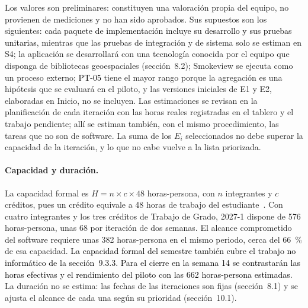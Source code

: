 Los valores son preliminares: constituyen una valoración propia del equipo, no provienen de mediciones y no han sido aprobados. Sus supuestos son los siguientes: \textcolor{black}{cada paquete de implementación incluye su desarrollo y sus pruebas unitarias}, mientras que las pruebas de integración y de sistema solo se estiman en S4; la aplicación se desarrollará con una tecnología conocida por el equipo que disponga de bibliotecas geoespaciales (sección~8.2); Smokeview se ejecuta como un proceso externo; \textcolor{black}{PT-05} tiene el mayor rango porque la agregación es una hipótesis que se evaluará en el piloto, y las versiones iniciales de E1 y E2, elaboradas en Inicio, no se incluyen. Las estimaciones se revisan en la planificación de cada iteración con las horas reales registradas en el tablero y el trabajo pendiente; allí se estiman también, con el mismo procedimiento, las tareas que no son de software. La suma de los $E_i$ seleccionados no debe superar la capacidad de la iteración, y lo que no cabe vuelve a la lista priorizada.

\paragraph{Capacidad y duración.} La capacidad formal es $H = n \times c \times 48$ horas-persona, con $n$ integrantes y $c$ créditos, pues un crédito equivale a 48 horas de trabajo del estudiante~\cite{decreto1330}. Con cuatro integrantes y los tres créditos de Trabajo de Grado, 2027-1 dispone de 576 horas-persona, unas 68 por iteración de dos semanas. El alcance comprometido del software requiere unas 382 horas-persona en el mismo periodo, cerca del 66~\% de esa capacidad. \textcolor{black}{La capacidad formal del semestre también cubre el trabajo no informático de la sección~9.3.3. Para el cierre en la semana 14 se contrastarán las horas efectivas y el rendimiento del piloto con las 662 horas-persona estimadas.} La duración no se estima: las fechas de las iteraciones son fijas (sección~8.1) y se ajusta el alcance de cada una según su prioridad (sección~10.1).

